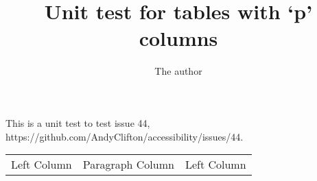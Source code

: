 \documentclass{article}
\title{Unit test for tables with `p' columns}
\author{The author}
\begin{document}
\maketitle

This is a unit test to test issue 44, https://github.com/AndyClifton/accessibility/issues/44.



\begin{tabular}{lp{15em}l}
Left Column & Paragraph Column & Left Column
\end{tabular}
\end{document}
